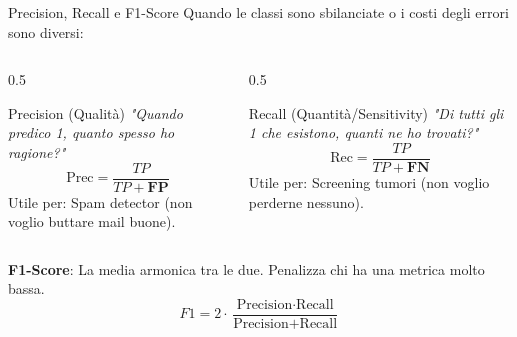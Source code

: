 \documentclass[aspectratio=169, 10pt]{beamer}
\begin{document}
\begin{frame}{Precision, Recall e F1-Score}
    Quando le classi sono sbilanciate o i costi degli errori sono diversi:
    
    \begin{columns}[T]
        \begin{column}{0.5\textwidth}
            \begin{block}{Precision (Qualità)}
                \emph{"Quando predico 1, quanto spesso ho ragione?"}
                \[ \text{Prec} = \frac{TP}{TP + \mathbf{FP}} \]
                \small Utile per: Spam detector (non voglio buttare mail buone).
            \end{block}
        \end{column}
        \begin{column}{0.5\textwidth}
            \begin{block}{Recall (Quantità/Sensitivity)}
                \emph{"Di tutti gli 1 che esistono, quanti ne ho trovati?"}
                \[ \text{Rec} = \frac{TP}{TP + \mathbf{FN}} \]
                \small Utile per: Screening tumori (non voglio perderne nessuno).
            \end{block}
        \end{column}
    \end{columns}
    
    \vspace{1em}
    \textbf{F1-Score}: La media armonica tra le due. Penalizza chi ha una metrica molto bassa.
    \[ F1 = 2 \cdot \frac{\text{Precision} \cdot \text{Recall}}{\text{Precision} + \text{Recall}} \]
\end{frame}
\end{document}
